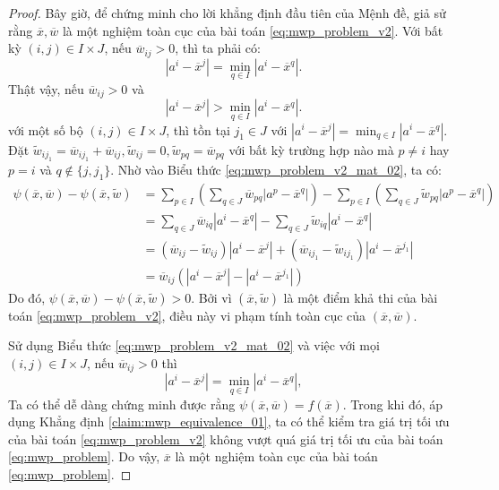 \documentclass[a4paper]{report}
\begin{document}
\begin{proof}
        Bây giờ, để chứng minh cho lời khẳng định đầu tiên của Mệnh đề, giả sử rằng $\overline{x}, \overline{w}$ là một nghiệm toàn cục của bài toán \eqref{eq:mwp_problem_v2}. Với bất kỳ $(i, j) \in I \times J$, nếu $\overline{w}_{ij} > 0$, thì ta phải có:
        \begin{equation}
            \left|a^i - \overline{x}^j\right| = \min_{q \in I}\left|a^i - \overline{x}^q\right|.
        \end{equation}
        Thật vậy, nếu $\overline{w}_{ij} > 0$ và 
        \begin{equation}
            \left|a^i - \overline{x}^j\right| > \min_{q \in I}\left|a^i - \overline{x}^q\right|.
        \end{equation}
        với một số bộ $(i, j) \in I \times J$, thì tồn tại $j_1 \in J$ với $\left|a^i - \overline{x}^j\right| = \min_{q \in I}\left|a^i - \overline{x}^q\right|$. Đặt $\widetilde{w}_{ij_1} = \overline{w}_{ij_1} + \overline{w}_{ij}, \widetilde{w}_{ij} = 0, \widetilde{w}_{pq} = \overline{w}_{pq}$ với bất kỳ trường hợp nào mà $p \ne i$ hay $p = i$ và $q \notin \{j, j_1\}$. Nhờ vào Biểu thức \eqref{eq:mwp_problem_v2_mat_02}, ta có:
        \begin{align}
            \psi(\overline{x}, \overline{w}) - \psi(\overline{x}, \widetilde{w}) &= \sum_{p \in I}\left(\sum_{q \in J}\overline{w}_{pq}\left|a^p - \overline{x}^q\right|\right) - \sum_{p \in I}\left(\sum_{q \in J}\widetilde{w}_{pq}\left|a^p - \overline{x}^q\right|\right) \\
            &= \sum_{q \in J}\overline{w}_{iq}\left|a^i - \overline{x}^q\right| - \sum_{q \in J}\widetilde{w}_{iq}\left|a^i - \overline{x}^q\right| \\
            &= (\overline{w}_{ij} - \widetilde{w}_{ij})\left|a^i - \overline{x}^j\right| + (\overline{w}_{ij_1} - \widetilde{w}_{ij_1})\left|a^i - \overline{x}^{j_1}\right|\\
            &= \overline{w}_{ij}\left(\left|a^i - \overline{x}^j\right| - \left|a^i - \overline{x}^{j_1}\right|\right)
        \end{align}
        Do đó, $\psi(\overline{x}, \overline{w}) -  \psi(\overline{x}, \widetilde{w}) > 0$. Bởi vì $(\overline{x}, \widetilde{w})$ là một điểm khả thi của bài toán \eqref{eq:mwp_problem_v2}, điều này vi phạm tính toàn cục của $(\overline{x}, \overline{w})$.

        Sử dụng Biểu thức \eqref{eq:mwp_problem_v2_mat_02} và việc với mọi $(i, j) \in I \times J$, nếu $\overline{w}_{ij} > 0$ thì 
        \begin{equation}
            \left|a^i - \overline{x}^j\right| = \min_{q \in I}\left|a^i - \overline{x}^q\right|,
        \end{equation}
        Ta có thể dễ dàng chứng minh được rằng $\psi(\overline{x}, \overline{w}) = f(\overline{x})$. Trong khi đó, áp dụng Khẳng định \ref{claim:mwp_equivalence_01}, ta có thể kiểm tra giá trị tối ưu của bài toán \eqref{eq:mwp_problem_v2} không vượt quá giá trị tối ưu của bài toán \eqref{eq:mwp_problem}. Do vậy, $\overline{x}$ là một nghiệm toàn cục của bài toán \eqref{eq:mwp_problem}.


\end{proof}
\end{document}
